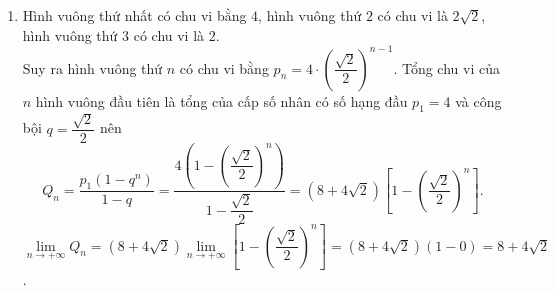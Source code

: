 \begin{bt}
{\begin{enumerate}
			$\lim \limits_{n \to +\infty}S_n=\lim \limits_{n \to +\infty}2\left[1-\left(\dfrac{1}{2}\right)^n\right]=2 \left[\lim \limits_{n \to +\infty}1-\lim \limits_{n \to +\infty}\left(\dfrac{1}{2}\right)^n\right]=2 $.
			\item Hình vuông thứ nhất có chu vi bằng $4$, hình vuông thứ $2$ có chu vi là $2\sqrt{2}$, hình vuông thứ $3$ có chu vi là $2$.\\
			Suy ra hình vuông thứ $n$ có chu vi bằng $p_n=4\cdot \left(\dfrac{\sqrt{2}}{2}\right)^{n-1}$.
			Tổng chu vi của $n$ hình vuông đầu tiên là tổng của cấp số nhân có  số hạng đầu $p_1=4$ và công bội $q=\dfrac{\sqrt{2}}{2}$ nên 
			\[ Q_n=\dfrac{p_1\left(1-q^n\right)}{1-q}=\dfrac{4\left(1-\left(\dfrac{\sqrt{2}}{2}\right)^n\right)}{1-\dfrac{\sqrt{2}}{2}}=\left(8+4\sqrt{2}\right)\left[1-\left(\dfrac{\sqrt{2}}{2}\right)^n\right].\]
			$\lim \limits_{n \to +\infty}Q_n=\left(8+4\sqrt{2}\right)\lim \limits_{n \to +\infty}\left[1-\left(\dfrac{\sqrt{2}}{2}\right)^n\right]=\left(8+4\sqrt{2}\right)\left(1-0\right)=8+4\sqrt{2}$.
		\end{enumerate}	
	}
\end{bt}

